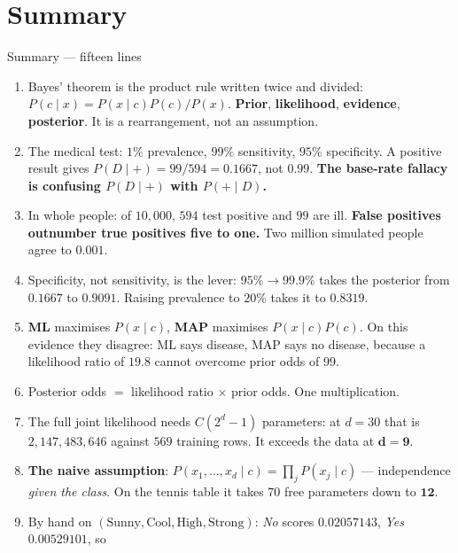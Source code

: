 \documentclass[aspectratio=169]{beamer}
\begin{document}
\section{Summary}
\label{sec:summary}

\begin{frame}[shrink=18]{Summary --- fifteen lines}
  \begin{enumerate}\small
    \item Bayes' theorem is the product rule written twice and divided:
      $P(c \mid x) = P(x \mid c)P(c)/P(x)$. \textbf{Prior}, \textbf{likelihood},
      \textbf{evidence}, \textbf{posterior}. It is a rearrangement, not an
      assumption.
    \item The medical test: $1\%$ prevalence, $99\%$ sensitivity, $95\%$
      specificity. A positive result gives $P(D \mid +) = 99/594 =
      \mathbf{0.1667}$, not $0.99$. \textbf{The base-rate fallacy is
      confusing $P(D \mid +)$ with $P(+ \mid D)$.}
    \item In whole people: of $10{,}000$, $594$ test positive and $99$ are
      ill. \textbf{False positives outnumber true positives five to one.}
      Two million simulated people agree to $0.001$.
    \item Specificity, not sensitivity, is the lever: $95\% \to 99.9\%$ takes
      the posterior from $0.1667$ to $0.9091$. Raising prevalence to $20\%$
      takes it to $0.8319$.
    \item \textbf{ML} maximises $P(x \mid c)$, \textbf{MAP} maximises
      $P(x \mid c)P(c)$. On this evidence they disagree: ML says disease, MAP
      says no disease, because a likelihood ratio of $19.8$ cannot overcome
      prior odds of $99$.
    \item Posterior odds $=$ likelihood ratio $\times$ prior odds. One
      multiplication.
    \item The full joint likelihood needs $C(2^d-1)$ parameters: at $d=30$
      that is $2{,}147{,}483{,}646$ against $569$ training rows. It exceeds
      the data at $\mathbf{d = 9}$.
    \item \textbf{The naive assumption}: $P(x_1,\ldots,x_d \mid c) =
      \prod_j P(x_j \mid c)$ --- independence \emph{given the class}. On the
      tennis table it takes $70$ free parameters down to $\mathbf{12}$.
    \item By hand on $(\text{Sunny},\text{Cool},\text{High},\text{Strong})$:
      \emph{No} scores $0.02057143$, \emph{Yes} $0.00529101$, so

\end{enumerate}
\end{frame}
\end{document}
